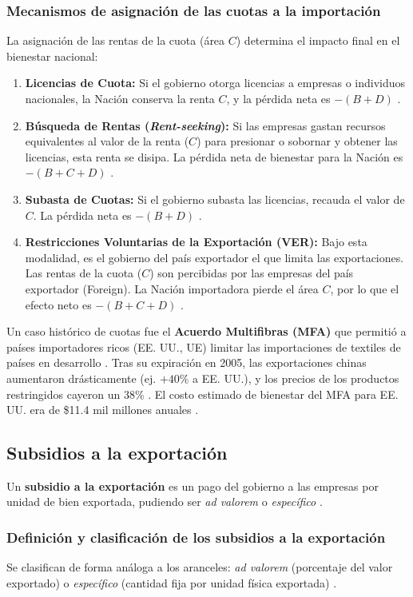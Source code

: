 \subsubsection{Mecanismos de asignación de las cuotas a la importación}
La asignación de las rentas de la cuota (área $C$) determina el impacto final en el bienestar nacional:
\begin{enumerate}
    \item \textbf{Licencias de Cuota:} Si el gobierno otorga licencias a empresas o individuos nacionales, la Nación conserva la renta $C$, y la pérdida neta es $-(B+D)$ .
    \item \textbf{Búsqueda de Rentas (\textit{Rent-seeking}):} Si las empresas gastan recursos equivalentes al valor de la renta ($C$) para presionar o sobornar y obtener las licencias, esta renta se disipa. La pérdida neta de bienestar para la Nación es $-(B+C+D)$ .
    \item \textbf{Subasta de Cuotas:} Si el gobierno subasta las licencias, recauda el valor de $C$. La pérdida neta es $-(B+D)$ .
    \item \textbf{Restricciones Voluntarias de la Exportación (VER):} Bajo esta modalidad, es el gobierno del país exportador el que limita las exportaciones. Las rentas de la cuota ($C$) son percibidas por las empresas del país exportador (Foreign). La Nación importadora pierde el área $C$, por lo que el efecto neto es $-(B+C+D)$ .
\end{enumerate}
Un caso histórico de cuotas fue el \textbf{Acuerdo Multifibras (MFA)} que permitió a países importadores ricos (EE. UU., UE) limitar las importaciones de textiles de países en desarrollo . Tras su expiración en 2005, las exportaciones chinas aumentaron drásticamente (ej. $+40\%$ a EE. UU.), y los precios de los productos restringidos cayeron un 38\% . El costo estimado de bienestar del MFA para EE. UU. era de \$11.4 mil millones anuales .

\subsection{Subsidios a la exportación}
Un \textbf{subsidio a la exportación} es un pago del gobierno a las empresas por unidad de bien exportada, pudiendo ser \textit{ad valorem} o \textit{específico} .

\subsubsection{Definición y clasificación de los subsidios a la exportación}
Se clasifican de forma análoga a los aranceles: \textit{ad valorem} (porcentaje del valor exportado) o \textit{específico} (cantidad fija por unidad física exportada) .

